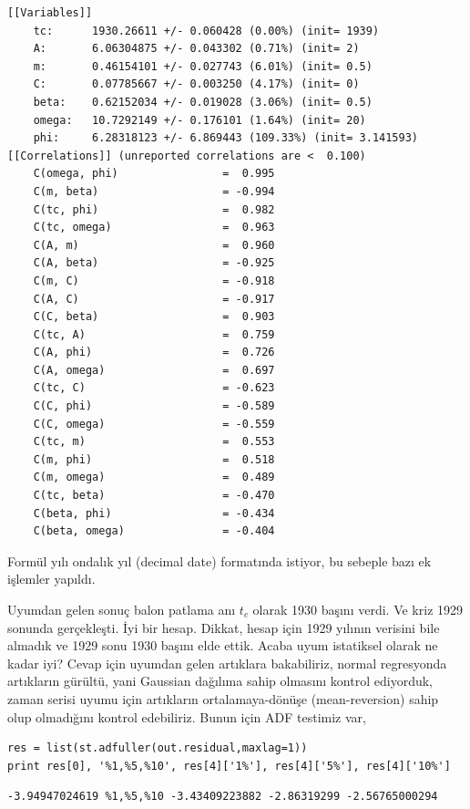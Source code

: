 \documentclass[12pt,fleqn]{article}\usepackage{../../common}
\begin{document}
\begin{verbatim}
[[Variables]]
    tc:      1930.26611 +/- 0.060428 (0.00%) (init= 1939)
    A:       6.06304875 +/- 0.043302 (0.71%) (init= 2)
    m:       0.46154101 +/- 0.027743 (6.01%) (init= 0.5)
    C:       0.07785667 +/- 0.003250 (4.17%) (init= 0)
    beta:    0.62152034 +/- 0.019028 (3.06%) (init= 0.5)
    omega:   10.7292149 +/- 0.176101 (1.64%) (init= 20)
    phi:     6.28318123 +/- 6.869443 (109.33%) (init= 3.141593)
[[Correlations]] (unreported correlations are <  0.100)
    C(omega, phi)                =  0.995 
    C(m, beta)                   = -0.994 
    C(tc, phi)                   =  0.982 
    C(tc, omega)                 =  0.963 
    C(A, m)                      =  0.960 
    C(A, beta)                   = -0.925 
    C(m, C)                      = -0.918 
    C(A, C)                      = -0.917 
    C(C, beta)                   =  0.903 
    C(tc, A)                     =  0.759 
    C(A, phi)                    =  0.726 
    C(A, omega)                  =  0.697 
    C(tc, C)                     = -0.623 
    C(C, phi)                    = -0.589 
    C(C, omega)                  = -0.559 
    C(tc, m)                     =  0.553 
    C(m, phi)                    =  0.518 
    C(m, omega)                  =  0.489 
    C(tc, beta)                  = -0.470 
    C(beta, phi)                 = -0.434 
    C(beta, omega)               = -0.404 
\end{verbatim}

Formül yılı ondalık yıl (decimal date) formatında istiyor, bu sebeple bazı
ek işlemler yapıldı.

Uyumdan gelen sonuç balon patlama anı $t_c$ olarak 1930 başını verdi. Ve
kriz 1929 sonunda gerçekleşti. İyi bir hesap. Dikkat, hesap için 1929
yılının verisini bile almadık ve 1929 sonu 1930 başını elde ettik. Acaba
uyum istatiksel olarak ne kadar iyi?  Cevap için uyumdan gelen artıklara
bakabiliriz, normal regresyonda artıkların gürültü, yani Gaussian dağılıma
sahip olmasını kontrol ediyorduk, zaman serisi uyumu için artıkların
ortalamaya-dönüşe (mean-reversion) sahip olup olmadığını kontrol
edebiliriz. Bunun için ADF testimiz var,

\begin{verbatim}
res = list(st.adfuller(out.residual,maxlag=1))
print res[0], '%1,%5,%10', res[4]['1%'], res[4]['5%'], res[4]['10%']
\end{verbatim}

\begin{verbatim}
-3.94947024619 %1,%5,%10 -3.43409223882 -2.86319299 -2.56765000294
\end{verbatim}
\end{document}
